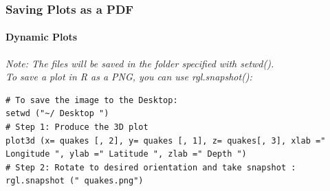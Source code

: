 \begin{frame}[fragile]
\frametitle{Saving Plots as a PDF}
\framesubtitle{Dynamic Plots}

\itshape Note: \normalfont The files will be saved in the folder specified with \ttfamily setwd(). \normalfont \\
To save a plot in \ttfamily R \normalfont as a PNG, you can use \ttfamily rgl.snapshot(): \normalfont

\begin{lstlisting}
# To save the image to the Desktop:
setwd ("~/ Desktop ")
# Step 1: Produce the 3D plot
plot3d (x= quakes [, 2], y= quakes [, 1], z= quakes[, 3], xlab =" Longitude ", ylab =" Latitude ", zlab =" Depth ")
# Step 2: Rotate to desired orientation and take snapshot :
rgl.snapshot (" quakes.png")
\end{lstlisting}

\end{frame}
